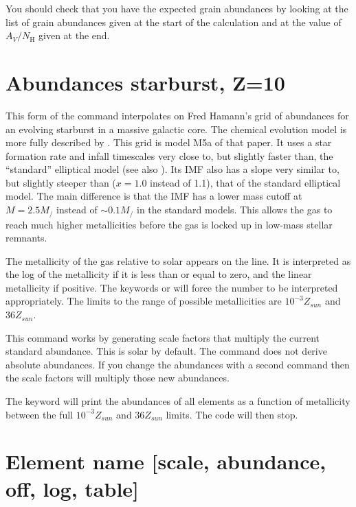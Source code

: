 You should check that you have the expected grain abundances by looking
at the list of grain abundances given at the start of the calculation and
at the value of $A_V/N_{\mathrm{H}}$ given at the end.

\section{Abundances starburst, Z=10}

This form of the  command interpolates on
Fred Hamann's grid
of abundances for an evolving starburst in a massive galactic core.
The
chemical evolution model is more fully described by \citet{Hamann1993}.
This grid is model M5a of that paper.
It uses a star formation
rate and infall timescales very close to, but slightly faster than,
the
``standard'' elliptical model (see also \citealp{Arimoto1987,Matteucci1986,Matteucci1987,Bica1988}).
Its IMF also
has a slope very similar to, but slightly steeper than
($x = 1.0$ instead of 1.1), that of the standard elliptical model.
The main difference is
that the IMF has a lower mass cutoff at $M = 2.5 M_/$ instead of
$\sim 0.1 M_/$ in the standard models.
This allows the gas to reach much higher metallicities
before the gas is locked up in low-mass stellar remnants.

The metallicity of the gas relative to solar appears on the line.
It is interpreted as the log of the metallicity if it is
less than or equal
to zero, and the linear metallicity if positive.
The keywords
 or 
will force the number to be interpreted appropriately.
The limits to the
range of possible metallicities are $10^{-3} Z_{sun}$ and $36 Z_{sun}$.

This command works by generating scale factors that multiply
the current standard abundance.
This is solar by default.
The command does not derive
absolute abundances.
If you change the abundances with a second
command then the scale factors will multiply those new abundances.

The keyword  will print the abundances of
all elements as a function
of metallicity between the full $10^{-3} Z_{sun}$ and
$36 Z_{sun}$ limits.
The code will then stop.

\section{Element name [scale, abundance, off, log, table]}

